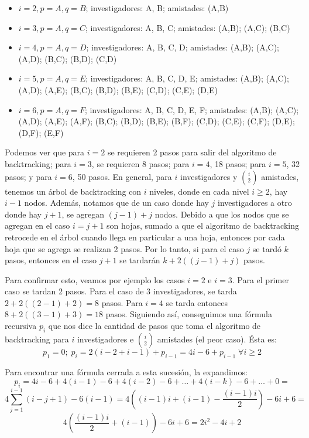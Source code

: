 \documentclass[12pt, a4paper,english,spanish]{article}
\begin{document}
\begin{itemize}
\begin{itemize}
\item $i=2, p=A, q=B$; investigadores: A, B; amistades: (A,B)
\item $i=3, p=A, q=C$; investigadores: A, B, C; amistades: (A,B); (A,C); (B,C)
\item $i=4, p=A, q=D$; investigadores: A, B, C, D; amistades: (A,B); (A,C); (A,D); (B,C); (B,D); (C,D)
\item $i=5, p=A, q=E$; investigadores: A, B, C, D, E; amistades: (A,B); (A,C); (A,D); (A,E); (B,C); (B,D); (B,E); (C,D); (C,E); (D,E)
\item $i=6, p=A, q=F$; investigadores: A, B, C, D, E, F; amistades: (A,B); (A,C); (A,D); (A,E); (A,F); (B,C); (B,D); (B,E); (B,F); (C,D); (C,E); (C,F); (D,E); (D,F); (E,F)
\end{itemize}   



Podemos ver que para $i=2$ se requieren 2 pasos para salir del algoritmo de backtracking; para $i=3$, se requieren 8 pasos; para $i=4$, 18 pasos; para $i=5$, 32 pasos; y para $i=6$, 50 pasos. En general, para $i$ investigadores y $\binom{i}{2}$ amistades, tenemos un \'arbol de backtracking con $i$ niveles, donde en cada nivel $i \geq 2$, hay $i-1$ nodos. Adem\'as, notamos que de un caso donde hay $j$ investigadores a otro donde hay $j+1$, se agregan $(j-1)+j$ nodos. Debido a que los nodos que se agregan en el caso $i=j+1$ son hojas, sumado a que el algoritmo de backtracking retrocede en el \'arbol cuando llega en particular a una hoja, entonces por cada hoja que se agrega se realizan 2 pasos. Por lo tanto, si para el caso $j$ se tard\'o $k$ pasos, entonces en el caso $j+1$ se tardar\'an $k+2((j-1)+j)$ pasos. 

Para confirmar esto, veamos por ejemplo los casos $i=2$ e $i=3$. Para el primer caso se tardan 2 pasos. Para el caso de 3 investigadores, se tarda $2+2((2-1)+2) = 8$ pasos. Para $i=4$ se tarda entonces $8+2((3-1)+3) = 18$ pasos. Siguiendo as\'i, conseguimos una f\'ormula recursiva $p_i$ que nos dice la cantidad de pasos que toma el algoritmo de backtracking para $i$ investigadores e $\binom{i}{2}$ amistades (el peor caso). \'Esta es: $$p_1 = 0; \; p_i = 2(i-2+i-1) + p_{i-1} = 4i-6+p_{i-1} \; \forall i \geq 2 $$

Para encontrar una f\'ormula cerrada a esta sucesi\'on, la expandimos: $$p_i = 4i-6 + 4(i-1)-6 + 4(i-2)-6 + \ldots + 4(i-k)-6 + \ldots + 0 =$$ $$4 \sum_{j=1}^{i-1} (i-j+1) - 6(i-1) = 4 \left((i-1)i + (i-1) - \frac{(i-1)i}{2}\right) - 6i + 6 =$$ $$4\left(\frac{(i-1)i}{2}+(i-1)\right) - 6i + 6 = 2i^2-4i+2$$


\end{itemize}
\end{document}
